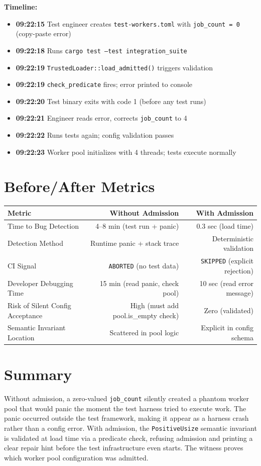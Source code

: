 \documentclass[11pt,a4paper]{article}
\begin{document}
\textbf{Timeline:}
\begin{itemize}
  \item \textbf{09:22:15} Test engineer creates \texttt{test-workers.toml} with \texttt{job\_count = 0} (copy-paste error)
  \item \textbf{09:22:18} Runs \texttt{cargo test --test integration\_suite}
  \item \textbf{09:22:19} \texttt{TrustedLoader::load\_admitted()} triggers validation
  \item \textbf{09:22:19} \texttt{check\_predicate} fires; error printed to console
  \item \textbf{09:22:20} Test binary exits with code 1 (before any test runs)
  \item \textbf{09:22:21} Engineer reads error, corrects \texttt{job\_count} to 4
  \item \textbf{09:22:22} Runs tests again; config validation passes
  \item \textbf{09:22:23} Worker pool initializes with 4 threads; tests execute normally
\end{itemize}

\section*{Before/After Metrics}

\begin{table}[h]
\centering
\begin{tabular}{lrr}
\toprule
\textbf{Metric} & \textbf{Without Admission} & \textbf{With Admission} \\
\midrule
Time to Bug Detection & 4–8 min (test run + panic) & 0.3 sec (load time) \\
Detection Method & Runtime panic + stack trace & Deterministic validation \\
CI Signal & \texttt{ABORTED} (no test data) & \texttt{SKIPPED} (explicit rejection) \\
Developer Debugging Time & 15 min (read panic, check pool) & 10 sec (read error message) \\
Risk of Silent Config Acceptance & High (must add pool.is\_empty check) & Zero (validated) \\
Semantic Invariant Location & Scattered in pool logic & Explicit in config schema \\
\bottomrule
\end{tabular}
\end{table}

\section*{Summary}

Without admission, a zero-valued \texttt{job\_count} silently created a phantom worker pool that would panic the moment the test harness tried to execute work. The panic occurred outside the test framework, making it appear as a harness crash rather than a config error. With admission, the \texttt{PositiveUsize} semantic invariant is validated at load time via a predicate check, refusing admission and printing a clear repair hint before the test infrastructure even starts. The witness proves which worker pool configuration was admitted.
\end{document}
